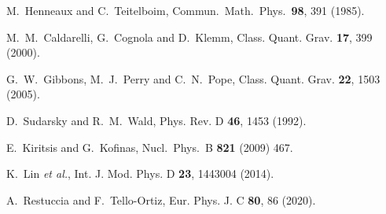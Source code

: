 \documentclass[preprint,aps,tightenlines,showkeys,nofootinbib,superscriptaddress]{revtex4}
\begin{document}
\begin{thebibliography}{999}
  M.~Henneaux and C.~Teitelboim,
  Commun.\ Math.\ Phys.\  {\bf 98}, 391 (1985).

M.~M.~Caldarelli, G.~Cognola and D.~Klemm,
Class. Quant. Grav. \textbf{17}, 399
(2000).

G.~W.~Gibbons, M.~J.~Perry and C.~N.~Pope,
Class. Quant. Grav. \textbf{22}, 1503
(2005).


D.~Sudarsky and R.~M.~Wald,
Phys. Rev. D \textbf{46}, 1453
(1992).

 E.~Kiritsis and G.~Kofinas,
  Nucl.\ Phys.\  B {\bf 821} (2009) 467.

K.~Lin \textit{et al.},
Int. J. Mod. Phys. D \textbf{23},
1443004 (2014).

A.~Restuccia and F.~Tello-Ortiz,
Eur. Phys. J. C \textbf{80},
86 (2020).


\end{thebibliography}
\end{document}
